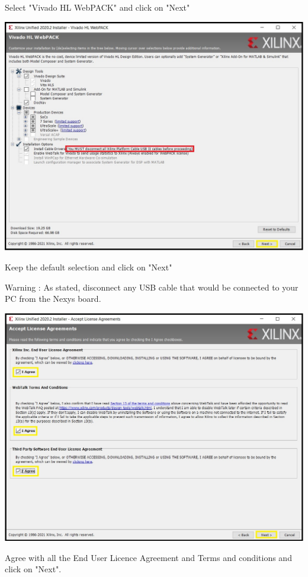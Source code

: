 Select "Vivado HL WebPACK" and click on "Next"

\includegraphics[width=\linewidth]{images/VivadoInstimg012.jpg}

Keep the default selection and click on "Next"

Warning : As stated, disconnect any USB cable that would be connected to your PC from the Nexys board.

\includegraphics[width=\linewidth]{images/VivadoInstimg013.jpg}

Agree with all the End User Licence Agreement and Terms and conditions and click on "Next".

